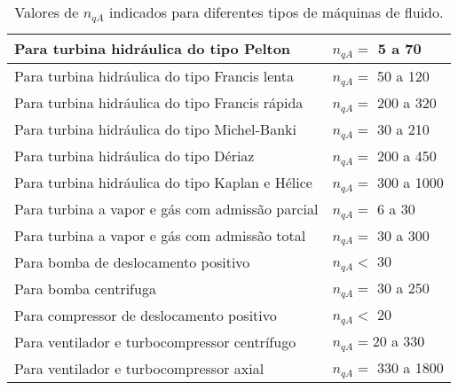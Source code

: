     \begin{table}[htb]
         \setlength{\tabcolsep}{20pt} %
        \centering
        \caption{Valores de $n_{qA}$ indicados para diferentes tipos de máquinas de fluido.}
        \label{tab-na}
        \begin{tabular}{l  l}
            \toprule
            Para turbina hidráulica do tipo Pelton & $n_{qA} =$ 5 a 70 \\
            \hline
            Para turbina hidráulica do tipo Francis lenta & $n_{qA} =$ 50 a 120 \\
            \hline
            Para turbina hidráulica do tipo Francis rápida & $n_{qA} =$ 200 a 320 \\
            \hline
            Para turbina hidráulica do tipo Michel-Banki  & $n_{qA} =$ 30 a 210 \\
            \hline
            Para turbina hidráulica do tipo Dériaz  & $n_{qA} =$ 200 a 450 \\
            \hline
            Para turbina hidráulica do tipo Kaplan e Hélice  & $n_{qA} =$ 300 a 1000 \\
            \hline
            Para turbina a vapor e gás com admissão parcial & $n_{qA} =$ 6 a 30 \\
            \hline
            Para turbina a vapor e gás com admissão total & $n_{qA} =$ 30 a 300 \\
            \hline
            Para bomba de deslocamento positivo & $n_{qA} <$  30 \\
            \hline
            Para bomba centrifuga & $n_{qA} =$  30 a 250 \\
            \hline
            Para compressor de deslocamento positivo & $n_{qA} <$ 20 \\
            \hline
            Para ventilador e turbocompressor centrífugo & $n_{qA} = 20$ a 330 \\
            \hline
            Para ventilador e turbocompressor axial & $n_{qA} =$ 330 a 1800 \\
            \bottomrule
        \end{tabular} %
    \end{table}


